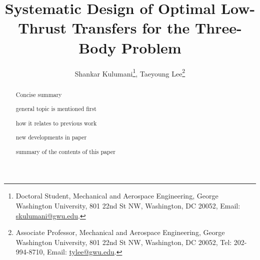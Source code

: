 \documentclass[letterpaper, preprint, paper,11pt]{AAS}	%
\begin{document}
\title{Systematic Design of Optimal Low-Thrust Transfers for the Three-Body Problem}

\author{Shankar Kulumani\thanks{Doctoral Student, Mechanical and Aerospace Engineering, George Washington University, 801 22nd St NW, Washington, DC 20052, Email: \href{mailto:skulumani@gwu.edu}{skulumani@gwu.edu}.},  
Taeyoung Lee\thanks{Associate Professor, Mechanical and Aerospace Engineering, George Washington University, 801 22nd St NW, Washington, DC 20052, Tel: 202-994-8710, Email: \href{mailto:tylee@gwu.edu}{tylee@gwu.edu}.}
}


\maketitle{} 		


\begin{abstract}
Concise summary

general topic is mentioned first

how it relates to previous work

new developments in paper

summary of the contents of this paper

\end{abstract}
\end{document}
